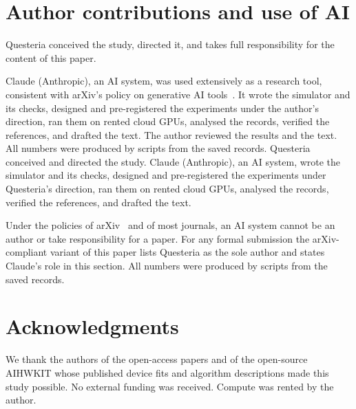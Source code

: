 \section*{Author contributions and use of AI}
\ifdefined\arxivvariant
Questeria conceived the study, directed it, and takes full responsibility for the content of this paper.

Claude (Anthropic), an AI system, was used extensively as a research tool, consistent with arXiv's policy on generative AI
tools~\cite{arxiv_policy}. It wrote the simulator and its checks, designed and pre-registered the experiments under the
author's direction, ran them on rented cloud GPUs, analysed the records, verified the references, and drafted the text. The
author reviewed the results and the text. All numbers were produced by scripts from the saved records.
\else
Questeria conceived and directed the study. Claude (Anthropic), an AI system, wrote the simulator and its checks, designed and
pre-registered the experiments under Questeria's direction, ran them on rented cloud GPUs, analysed the records, verified the
references, and drafted the text.

Under the policies of arXiv~\cite{arxiv_policy} and of most journals, an AI system cannot be an author or take responsibility
for a paper. For any formal submission the arXiv-compliant variant of this paper lists Questeria as the sole author and states
Claude's role in this section. All numbers were produced by scripts from the saved records.
\fi

\section*{Acknowledgments}
We thank the authors of the open-access papers and of the open-source AIHWKIT whose published device fits and algorithm
descriptions made this study possible. No external funding was received. Compute was rented by the author.




\appendix






